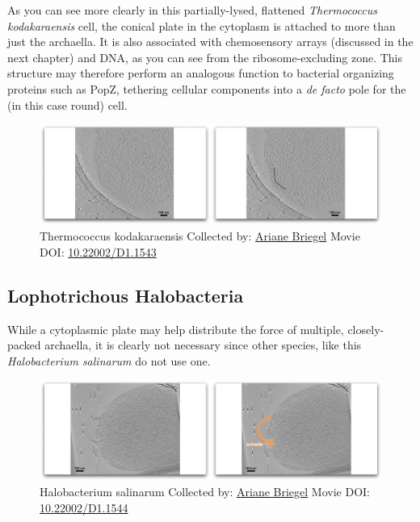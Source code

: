 \documentclass[]{tufte-book}
\begin{document}
As you can see more clearly in this partially-lysed, flattened
\emph{Thermococcus kodakaraensis} cell, the conical plate in the
cytoplasm is attached to more than just the archaella. It is also
associated with chemosensory arrays (discussed in the next chapter) and
DNA, as you can see from the ribosome-excluding zone. This structure may
therefore perform an analogous function to bacterial organizing proteins
such as PopZ, tethering cellular components into a \emph{de facto} pole
for the (in this case round) cell.





\begin{figure}
\includegraphics{movie_stills/6_9b} \caption[Thermococcus kodakaraensis Collected by:
\protect\hyperlink{ariane_briegel}{Ariane Briegel} Movie DOI:
\href{https://doi.org/10.22002/D1.1543}{10.22002/D1.1543}]{Thermococcus kodakaraensis Collected by:
\protect\hyperlink{ariane_briegel}{Ariane Briegel} Movie DOI:
\href{https://doi.org/10.22002/D1.1543}{10.22002/D1.1543}}\label{fig:6-9b}
\end{figure}

\hypertarget{Lophotrichous_Halobacteria}{\subsection{Lophotrichous
Halobacteria}\label{Lophotrichous_Halobacteria}}

While a cytoplasmic plate may help distribute the force of multiple,
closely-packed archaella, it is clearly not necessary since other
species, like this \emph{Halobacterium salinarum} do not use one.





\begin{figure}
\includegraphics{movie_stills/6_9c} \caption[Halobacterium salinarum Collected by:
\protect\hyperlink{ariane_briegel}{Ariane Briegel} Movie DOI:
\href{https://doi.org/10.22002/D1.1544}{10.22002/D1.1544}]{Halobacterium salinarum Collected by:
\protect\hyperlink{ariane_briegel}{Ariane Briegel} Movie DOI:
\href{https://doi.org/10.22002/D1.1544}{10.22002/D1.1544}}\label{fig:6-9c}
\end{figure}
\end{document}
